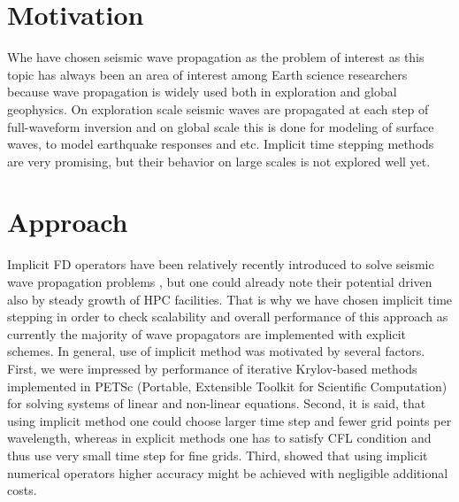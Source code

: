 \documentclass[12pt,a4paper]{report}
\begin{document}
\section*{Motivation}
Whe have chosen seismic wave propagation as the problem of interest as this topic has always been an area of interest among Earth science researchers because wave propagation is widely used both in exploration and global geophysics. On exploration scale seismic waves are propagated at each step of full-waveform inversion and on global scale this is done for modeling of surface waves, to model earthquake responses and etc. Implicit time stepping methods are very promising, but their behavior on large scales is not explored well yet.


\section*{Approach}
Implicit FD operators have been relatively recently introduced to solve seismic wave propagation problems \citep{liu2009practical, kosloff2010acoustic, chu2010frequency}, but one could already note their potential driven also by steady growth of HPC facilities. That is why we have chosen implicit time stepping in order to check scalability and overall performance of this approach as currently the majority of wave propagators are implemented with explicit schemes. In general, use of implicit method was motivated by several factors. First, we were impressed by performance of iterative Krylov-based methods implemented in PETSc (Portable, Extensible Toolkit for Scientific Computation) for solving systems of linear and non-linear equations. Second, it is said, that using implicit method one could choose larger time step and fewer grid points per wavelength, whereas in explicit methods one has to satisfy CFL condition and thus use very small time step for fine grids. Third, \citep{chu2012implicit, chu2010frequency}  showed that using implicit numerical operators higher accuracy might be achieved with negligible additional costs.\\
\end{document}
